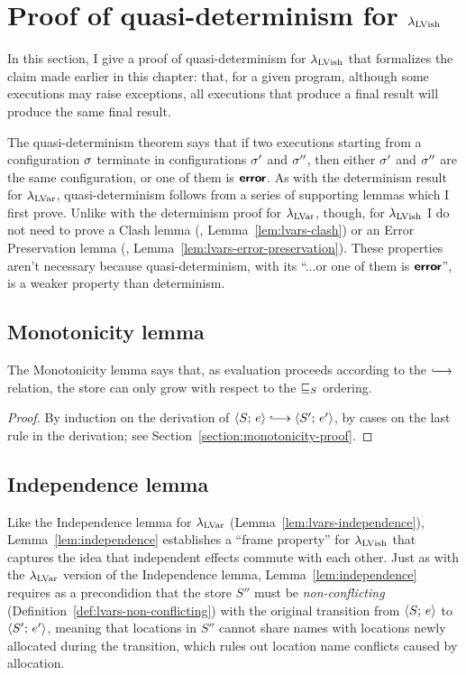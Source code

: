 \section{Proof of quasi-determinism for $\lambda_{\textrm{LVish}}$}\label{s:quasi-quasi-determinism}

In this section, I give a proof of quasi-determinism for
$\lambda_{\textrm{LVish}}$ that formalizes the claim made earlier in this chapter:
that, for a given program, although some executions may raise
exceptions, all executions that produce a final result will produce
the same final result.

The quasi-determinism theorem says that if two executions starting
from a configuration $\sigma$ terminate in configurations $\sigma'$ and
$\sigma''$, then either $\sigma'$ and $\sigma''$ are the same
configuration, or one of them is $\textbf{\textsf{error}}$.  As with the determinism
result for $\lambda_{\textrm{LVar}}$, quasi-determinism follows from a series of
supporting lemmas which I first prove.  Unlike with the determinism
proof for $\lambda_{\textrm{LVar}}$, though, for $\lambda_{\textrm{LVish}}$ I do not need to
prove a Clash lemma (\eg, Lemma~\ref{lem:lvars-clash}) or an Error
Preservation lemma (\eg, Lemma~\ref{lem:lvars-error-preservation}).
These properties aren't necessary because quasi-determinism, with its
``...or one of them is $\textbf{\textsf{error}}$'', is a weaker property than
determinism.

\subsection{Monotonicity lemma}\label{subsection:quasi-monotonicity}

The Monotonicity lemma says that, as evaluation proceeds according to
the $\parstepsto$ relation, the store can only grow with respect to
the $ \sqsubseteq_S $ ordering.

\LemMonotonicity
\begin{proof}
  By induction on the derivation of $\config{S}{e} \parstepsto
  \config{S'}{e'}$, by cases on the last rule in the derivation; see
  Section~\ref{section:monotonicity-proof}.
\end{proof}

\subsection{Independence lemma}\label{subsection:quasi-independence}

Like the Independence lemma for $\lambda_{\textrm{LVar}}$
(Lemma~\ref{lem:lvars-independence}), Lemma~\ref{lem:independence}
establishes a ``frame property'' for $\lambda_{\textrm{LVish}}$ that captures the
idea that independent effects commute with each other.  Just as with
the $\lambda_{\textrm{LVar}}$ version of the Independence lemma,
Lemma~\ref{lem:independence} requires as a precondidion that the store
$S''$ must be \emph{non-conflicting}
(Definition~\ref{def:lvars-non-conflicting}) with the original
transition from $\langle S;\, e \rangle$ to $\langle S';\, e' \rangle$, meaning that
locations in $S''$ cannot share names with locations newly allocated
during the transition, which rules out location name conflicts caused
by allocation.

